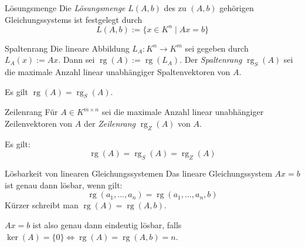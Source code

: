 \documentclass[german]{../spicker}
\newcommand{\rg}{\operatorname{rg}}
\begin{document}
\begin{defi}{Lösungsmenge}
    Die \emph{Lösungsmenge} $L(A, b)$ des zu $(A, b)$ gehörigen Gleichungssystems ist festgelegt durch
    $$
        L(A, b) := \{x \in K^n \mid Ax = b\}
    $$
\end{defi}

\begin{defi}{Spaltenrang}
    Die lineare Abbildung $L_A : K^n \to K^m$ sei gegeben durch $L_A(x) := Ax$. Dann sei $\rg(A) := \rg(L_A)$.
    Der \emph{Spaltenrang} $\rg_S(A)$ sei die maximale Anzahl linear unabhängiger Spaltenvektoren von $A$.

    Es gilt $\rg(A) = \rg_S(A)$.
\end{defi}

\begin{defi}{Zeilenrang}
    Für $A \in K^{m\times n}$ sei die maximale Anzahl linear unabhängiger Zeilenvektoren von $A$ der \emph{Zeilenrang} $\rg_Z(A)$ von $A$.

    Es gilt:
    $$
        \rg(A) = \rg_S(A) = \rg_Z(A)
    $$
\end{defi}

\begin{defi}{Lösbarkeit von linearen Gleichungssystemen}
    Das lineare Gleichungssystem $Ax = b$ ist genau dann lösbar, wenn gilt:
    $$
        \rg(a_1, \ldots, a_n) = \rg(a_1, \ldots, a_n, b)
    $$
    Kürzer schreibt man $\rg(A) = \rg(A, b)$.

    $Ax = b$ ist also genau dann eindeutig lösbar, falls $\ker(A) = \{0\} \iff \rg(A) = \rg(A, b) = n$.
\end{defi}
\end{document}
